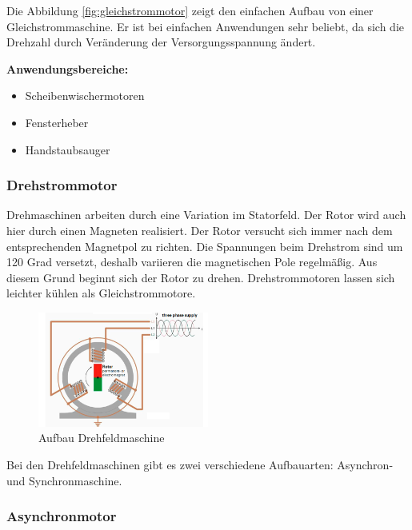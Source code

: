 Die Abbildung \ref{fig:gleichstrommotor} zeigt den einfachen Aufbau von einer Gleichstrommaschine. Er ist bei einfachen Anwendungen sehr beliebt, da sich die Drehzahl durch Veränderung der Versorgungsspannung ändert.\newline

\textbf{Anwendungsbereiche:}

\begin{itemize}
	\item{Scheibenwischermotoren}
	\item{Fensterheber}
	\item{Handstaubsauger}
\end{itemize}

\subsubsection{Drehstrommotor}
\label{sec:drehstrom}

Drehmaschinen arbeiten durch eine Variation im Statorfeld. Der Rotor wird auch hier durch einen Magneten realisiert. Der Rotor versucht sich immer nach dem entsprechenden Magnetpol zu richten. Die Spannungen beim Drehstrom sind um 120 Grad versetzt, deshalb variieren die magnetischen Pole regelmäßig. Aus diesem Grund beginnt sich der Rotor zu drehen. Drehstrommotoren lassen sich leichter kühlen als Gleichstrommotore. 

\begin{figure}[H]
\begin{center}
	\includegraphics[width=0.5\textwidth]{fig/Drehstrommotor}
	\caption{Aufbau Drehfeldmaschine}
\end{center}
\end{figure}

Bei den Drehfeldmaschinen gibt es zwei verschiedene Aufbauarten: Asynchron- und Synchronmaschine.

\subsubsection{Asynchronmotor}
\label{sec:asynchronmotor}


